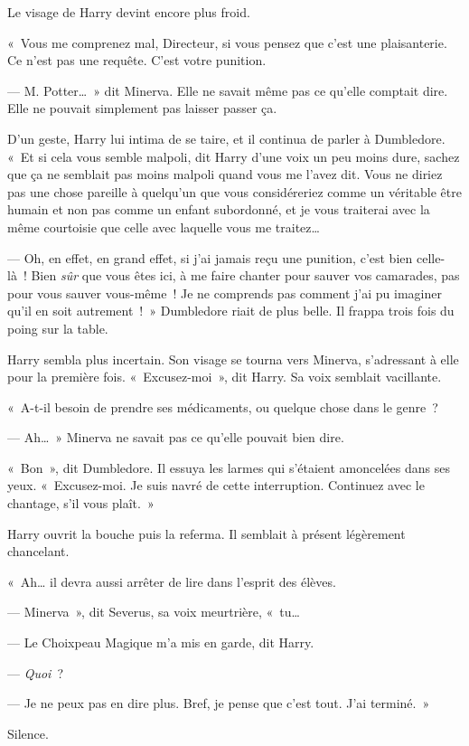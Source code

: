 Le visage de Harry devint encore plus froid.

«~Vous me comprenez mal, Directeur, si vous pensez que c'est une plaisanterie. Ce n'est pas une requête. C'est votre punition.

--- M. Potter…~» dit Minerva. Elle ne savait même pas ce qu'elle comptait dire. Elle ne pouvait simplement pas laisser passer ça.

D'un geste, Harry lui intima de se taire, et il continua de parler à Dumbledore. «~Et si cela vous semble malpoli, dit Harry d’une voix un peu moins dure, sachez que ça ne semblait pas moins malpoli quand vous me l'avez dit. Vous ne diriez pas une chose pareille à quelqu'un que vous considéreriez comme un véritable être humain et non pas comme un enfant subordonné, et je vous traiterai avec la même courtoisie que celle avec laquelle vous me traitez…

--- Oh, en effet, en grand effet, si j'ai jamais reçu une punition, c'est bien celle-là~! Bien \emph{sûr} que vous êtes ici, à me faire chanter pour sauver vos camarades, pas pour vous sauver vous-même~! Je ne comprends pas comment j'ai pu imaginer qu'il en soit autrement~!~» Dumbledore riait de plus belle. Il frappa trois fois du poing sur la table.

Harry sembla plus incertain. Son visage se tourna vers Minerva, s'adressant à elle pour la première fois. «~Excusez-moi~», dit Harry. Sa voix semblait vacillante.

«~A-t-il besoin de prendre ses médicaments, ou quelque chose dans le genre~?

--- Ah…~» Minerva ne savait pas ce qu'elle pouvait bien dire.

«~Bon~», dit Dumbledore. Il essuya les larmes qui s'étaient amoncelées dans ses yeux. «~Excusez-moi. Je suis navré de cette interruption. Continuez avec le chantage, s'il vous plaît.~»

Harry ouvrit la bouche puis la referma. Il semblait à présent légèrement chancelant.

«~Ah… il devra aussi arrêter de lire dans l'esprit des élèves.

--- Minerva~», dit Severus, sa voix meurtrière, «~tu…

--- Le Choixpeau Magique m'a mis en garde, dit Harry.

--- \emph{Quoi}~?

--- Je ne peux pas en dire plus. Bref, je pense que c'est tout. J'ai terminé.~»

Silence.

